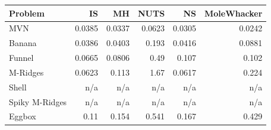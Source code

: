 \begin{tabular}{lrrrrr}
\toprule
Problem & IS & MH & NUTS & NS & MoleWhacker \\
\midrule
MVN & 0.0385 & 0.0337 & 0.0623 & 0.0305 & 0.0242 \\
Banana & 0.0386 & 0.0403 & 0.193 & 0.0416 & 0.0881 \\
Funnel & 0.0665 & 0.0806 & 0.49 & 0.107 & 0.102 \\
M-Ridges & 0.0623 & 0.113 & 1.67 & 0.0617 & 0.224 \\
Shell & n/a & n/a & n/a & n/a & n/a \\
Spiky M-Ridges & n/a & n/a & n/a & n/a & n/a \\
\midrule
Eggbox & 0.11 & 0.154 & 0.541 & 0.167 & 0.429 \\
\bottomrule
\end{tabular}
